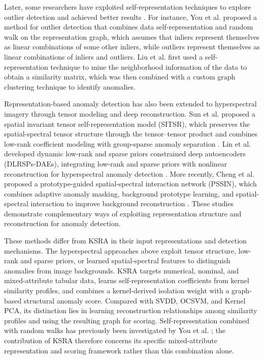 \documentclass[ASNA,twocolumn]{USG} %
\begin{document}
Later, some researchers have exploited self-representation techniques to explore outlier detection and achieved better results \cite{you2017provable,liu2023anomaly}. For instance, You et al. \cite{you2017provable} proposed a method for outlier detection that combines data self-representation and random walk on the representation graph, which assumes that inliers represent themselves as linear combinations of some other inliers, while outliers represent themselves as linear combinations of inliers and outliers.
Liu et al. \cite{liu2023anomaly} first used a self-representation technique to mine the neighborhood information of the data to obtain a similarity matrix, which was then combined with a custom graph clustering technique to identify anomalies.

Representation-based anomaly detection has also been extended to hyperspectral imagery through tensor modeling and deep reconstruction. Sun et al. proposed a spatial invariant tensor self-representation model (SITSR), which preserves the spatial-spectral tensor structure through the tensor–tensor product and combines low-rank coefficient modeling with group-sparse anomaly separation \cite{10019572}. Lin et al. developed dynamic low-rank and sparse priors constrained deep autoencoders (DLRSPs-DAEs), integrating low-rank and sparse priors with nonlinear reconstruction for hyperspectral anomaly detection \cite{lin2023dynamic}. More recently, Cheng et al. proposed a prototype-guided spatial-spectral interaction network (PSSIN), which combines adaptive anomaly masking, background prototype learning, and spatial-spectral interaction to improve background reconstruction \cite{cheng2025prototype}. These studies demonstrate complementary ways of exploiting representation structure and reconstruction for anomaly detection.

These methods differ from KSRA in their input representations and detection mechanisms. The hyperspectral approaches above exploit tensor structure, low-rank and sparse priors, or learned spatial-spectral features to distinguish anomalies from image backgrounds. KSRA targets numerical, nominal, and mixed-attribute tabular data, learns self-representation coefficients from kernel similarity profiles, and combines a kernel-derived isolation weight with a graph-based structural anomaly score. Compared with SVDD, OCSVM, and Kernel PCA, its distinction lies in learning reconstruction relationships among similarity profiles and using the resulting graph for scoring. Self-representation combined with random walks has previously been investigated by You et al. \cite{you2017provable}; the contribution of KSRA therefore concerns its specific mixed-attribute representation and scoring framework rather than this combination alone.
\end{document}
